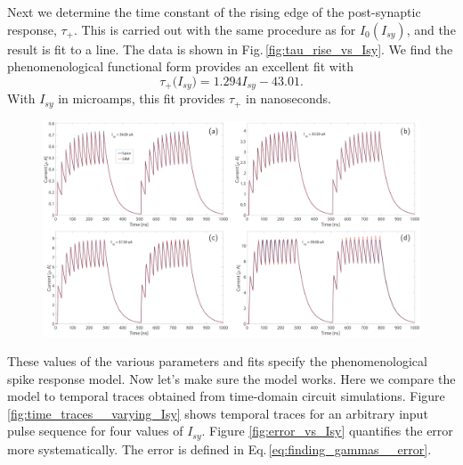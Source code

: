 \documentclass[]{article}
\begin{document}
Next we determine the time constant of the rising edge of the post-synaptic response, $\tau_{+}$. This is carried out with the same procedure as for $I_0(I_{sy})$, and the result is fit to a line. The data is shown in Fig.\,\ref{fig:tau_rise_vs_Isy}.
We find the phenomenological functional form provides an excellent fit with
\begin{equation}
\label{eq:I0_vs_Isy}
\tau_+\big(I_{sy}\big) =  1.294 I_{sy} - 43.01.
\end{equation}
With $I_{sy}$ in microamps, this fit provides $\tau_+$ in nanoseconds.

\begin{figure}[t!]
\centering
\includegraphics[width=17.2cm]{_time_traces__varying_Isy.pdf}
\end{figure}
These values of the various parameters and fits specify the phenomenological spike response model. Now let's make sure the model works. Here we compare the model to temporal traces obtained from time-domain circuit simulations. Figure \ref{fig:time_traces__varying_Isy} shows temporal traces for an arbitrary input pulse sequence for four values of $I_{sy}$. Figure \ref{fig:error_vs_Isy} quantifies the error more systematically. The error is defined in Eq.\,\ref{eq:finding_gammas__error}.
\end{document}
